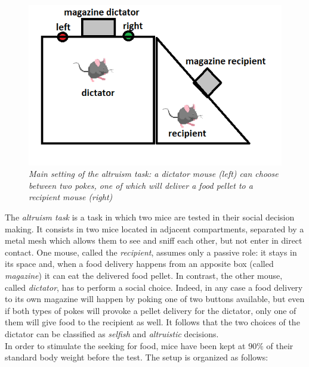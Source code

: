 \documentclass[12pt, a4paper]{report}
\begin{document}
\begin{figure}[H]
	\begin{center}
		\includegraphics[scale=0.55]{altruism.png} 
	\end{center} 
	\caption{\textit{Main setting of the altruism task: a dictator mouse (left) can choose between two pokes, one of which will deliver a food pellet to a recipient mouse (right)}} \label{altruism}
	
\end{figure}

The \textit{altruism task} is a task in which two mice are tested in their social decision making. It consists in two mice located in adjacent compartments, separated by a metal mesh which allows them to see and sniff each other, but not enter in direct contact. One mouse, called the \textit{recipient}, assumes only a passive role: it stays in its space and, when a food delivery happens from an apposite box (called \textit{magazine}) it can eat the delivered food pellet. 
In contrast, the other mouse, called \textit{dictator}, has to perform a social choice. Indeed, in any case a food delivery to its own magazine will happen by poking one of two buttons available, but even if both types of pokes will provoke a pellet delivery for the dictator, only one of them will give food to the recipient as well. It follows that the two choices of the dictator can be classified as \textit{selfish} and \textit{altruistic} decisions.\\
In order to stimulate the seeking for food, mice have been kept at $ 90 \%$ of their standard body weight before the test. The setup is organized as follows:
\end{document}
